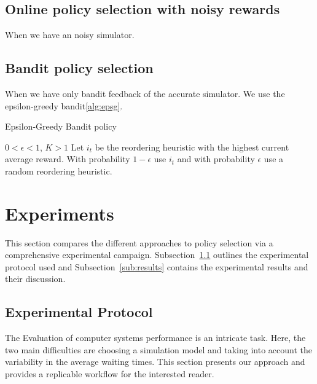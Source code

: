 \documentclass[sigconf]{acmart}
\begin{document}
\subsection{Online policy selection with noisy rewards}
\label{sub:noisy}
When we have an noisy simulator.

\subsection{Bandit policy selection}
\label{sub:bandit}
When we have only bandit feedback of the accurate simulator.
We use the epsilon-greedy bandit\ref{alg:epsg}.

\begin{algorithm}[h]
  \caption{Epsilon-Greedy Bandit policy}
  \begin{algorithmic}[1]
    \renewcommand{\algorithmicrequire}{\textbf{Input:}}
    \renewcommand{\algorithmicensure}{\textbf{Output:}}
    \REQUIRE $0 < \epsilon < 1$, $K>1$
    \STATE Let $i_t$ be the reordering heuristic with the highest current
    average reward.
    \STATE With probability $1-\epsilon$ use $i_t$ and with probability
    $\epsilon$ use a random reordering heuristic.
    \ENDFOR
  \end{algorithmic}
  \label{alg:epsg}
\end{algorithm}



\section{Experiments}
\label{sec:experiments}

This section compares the different approaches to policy selection via a
comprehensive experimental campaign.  Subsection~\ref{sub:protocol} outlines
the experimental protocol used and Subsection~\ref{sub:results} contains the
experimental results and their discussion.

\subsection{Experimental Protocol}
\label{sub:protocol}

The Evaluation of computer systems performance is an intricate
task\cite{feitbook}. Here, the two main difficulties are choosing a simulation
model and taking into account the variability in the average waiting times.
This section presents our approach and provides a replicable workflow
for the interested reader.
\end{document}
